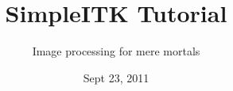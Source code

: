 \documentclass[18pt]{beamer}
\begin{document}
\title[SimpleITK - MICCAI 2011]{SimpleITK Tutorial}
\subtitle[IP for mere mortals]{Image processing for mere mortals}
\date[Sept 2011]{Sept 23, 2011}

\begin{frame}
\titlepage
\end{frame}










\begin{frame}
\titlepage
\end{frame}
\end{document}
